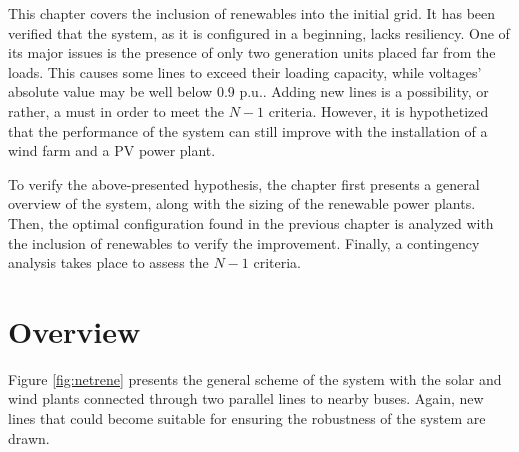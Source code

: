 This chapter covers the inclusion of renewables into the initial grid. It has been verified that the system, as it is configured in a beginning, lacks resiliency. One of its major issues is the presence of only two generation units placed far from the loads. This causes some lines to exceed their loading capacity, while voltages' absolute value may be well below 0.9 p.u.. Adding new lines is a possibility, or rather, a must in order to meet the $N-1$ criteria. However, it is hypothetized that the performance of the system can still improve with the installation of a wind farm and a PV power plant.

To verify the above-presented hypothesis, the chapter first presents a general overview of the system, along with the sizing of the renewable power plants. Then, the optimal configuration found in the previous chapter is analyzed with the inclusion of renewables to verify the improvement. Finally, a contingency analysis takes place to assess the $N-1$ criteria. 

\section{Overview}
Figure \ref{fig:netrene} presents the general scheme of the system with the solar and wind plants connected through two parallel lines to nearby buses. Again, new lines that could become suitable for ensuring the robustness of the system are drawn. 

